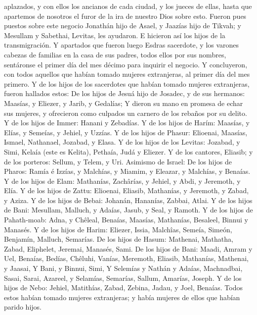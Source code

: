 aplazados, y con ellos los ancianos de cada ciudad, y los jueces de
ellas, hasta que apartemos de nosotros el furor de la ira de nuestro
Dios sobre esto.  Fueron pues puestos sobre este negocio
Jonathán hijo de Asael, y Jaazías hijo de Tikvah; y Mesullam y Sabethai,
Levitas, les ayudaron.  E hicieron así los hijos de la
transmigración. Y apartados que fueron luego Esdras sacerdote, y los
varones cabezas de familias en la casa de sus padres, todos ellos por
sus nombres, sentáronse el primer día del mes décimo para inquirir el
negocio.  Y concluyeron, con todos aquellos que habían
tomado mujeres extranjeras, al primer día del mes primero.
 Y de los hijos de los sacerdotes que habían tomado
mujeres extranjeras, fueron hallados estos: De los hijos de Jesuá hijo
de Josadec, y de sus hermanos: Maasías, y Eliezer, y Jarib, y Gedalías;
 Y dieron su mano en promesa de echar sus mujeres, y
ofrecieron como culpados un carnero de los rebaños por su delito.
 Y de los hijos de Immer: Hanani y Zebadías.
 Y de los hijos de Harím: Maasías, y Elías, y Semeías, y
Jehiel, y Uzzías.  Y de los hijos de Phasur: Elioenai,
Maasías, Ismael, Nathanael, Jozabad, y Elasa.  Y de los
hijos de los Levitas: Jozabad, y Simi, Kelaía (este es Kelita), Pethaía,
Judá y Eliezer.  Y de los cantores, Eliasib; y de los
porteros: Sellum, y Telem, y Uri.  Asimismo de Israel: De
los hijos de Pharos: Ramía é Izzías, y Malchías, y Miamim, y Eleazar, y
Malchías, y Benaías.  Y de los hijos de Elam: Mathanías,
Zachârías, y Jehiel, y Abdi, y Jeremoth, y Elía.  Y de
los hijos de Zattu: Elioenai, Eliasib, Mathanías, y Jeremoth, y Zabad, y
Aziza.  Y de los hijos de Bebai: Johanán, Hananías,
Zabbai, Atlai.  Y de los hijos de Bani: Mesullam,
Malluch, y Adaías, Jasub, y Seal, y Ramoth.  Y de los
hijos de Pahath-moab: Adna, y Chêleal, Benaías, Maasías, Mathanías,
Besaleel, Binnui y Manasés.  Y de los hijos de Harim:
Eliezer, Issia, Malchîas, Semeía, Simeón,  Benjamín,
Malluch, Semarías.  De los hijos de Hasum: Mathenai,
Mathatha, Zabad, Eliphelet, Jeremai, Manasés, Sami.  De
los hijos de Bani: Maadi, Amram y Uel,  Benaías, Bedías,
Chêluhi,  Vanías, Meremoth, Eliasib, 
Mathanías, Mathenai, y Jaasai,  Y Bani, y Binnui, Simi,
 Y Selemías y Nathán y Adaías, 
Machnadbai, Sasai, Sarai,  Azareel, y Selamías, Semarías,
 Sallum, Amarías, Joseph.  Y de los hijos
de Nebo: Jehiel, Matithías, Zabad, Zebina, Jadau, y Joel, Benaías.
 Todos estos habían tomado mujeres extranjeras; y había
mujeres de ellos que habían parido hijos.
